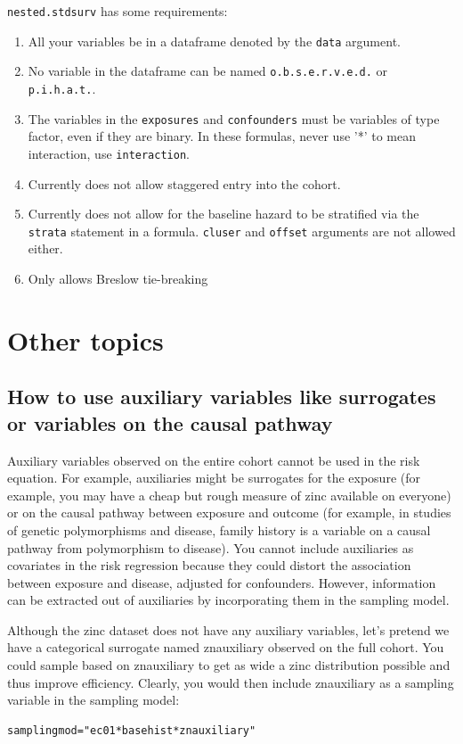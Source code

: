 \documentclass[10pt]{article}
\begin{document}
\texttt{nested.stdsurv} has some requirements:
\begin{enumerate}
\item All your variables be in a dataframe denoted by the \texttt{data} argument.
\item No variable in the dataframe can be named \texttt{o.b.s.e.r.v.e.d.} or
\texttt{p.i.h.a.t.}.
\item The variables in the \texttt{exposures} and \texttt{confounders} must be variables
of type factor, even if they are binary.  In these formulas, never use '*' to mean
interaction, use \texttt{interaction}.
\item Currently does not allow staggered entry into the cohort.
\item Currently does not allow for the baseline hazard to be stratified via the
\texttt{strata} statement in a formula.  \texttt{cluser} and \texttt{offset} arguments are
not allowed either.
\item Only allows Breslow tie-breaking
\end{enumerate}




\section{Other topics}
\label{sec:other-topics}

\subsection{How to use auxiliary variables like surrogates or variables on the causal
  pathway}
\label{sec:how-use-auxiliary}

Auxiliary variables observed on the entire cohort cannot be used in the risk equation.
For example, auxiliaries might be surrogates for the exposure (for example, you may have a
cheap but rough measure of zinc available on everyone) or on the causal pathway between
exposure and outcome (for example, in studies of genetic polymorphisms and disease, family
history is a variable on a causal pathway from polymorphism to disease).  You cannot
include auxiliaries as covariates in the risk regression because they could distort the
association between exposure and disease, adjusted for confounders.  However, information
can be extracted out of auxiliaries by incorporating them in the sampling model.

Although the zinc dataset does not have any auxiliary variables, let's pretend we have a
categorical surrogate named znauxiliary observed on the full cohort.  You could sample
based on znauxiliary to get as wide a zinc distribution possible and thus improve
efficiency.  Clearly, you would then include znauxiliary as a sampling variable in the
sampling model:
\begin{verbatim}
samplingmod="ec01*basehist*znauxiliary"
\end{verbatim}
\end{document}
